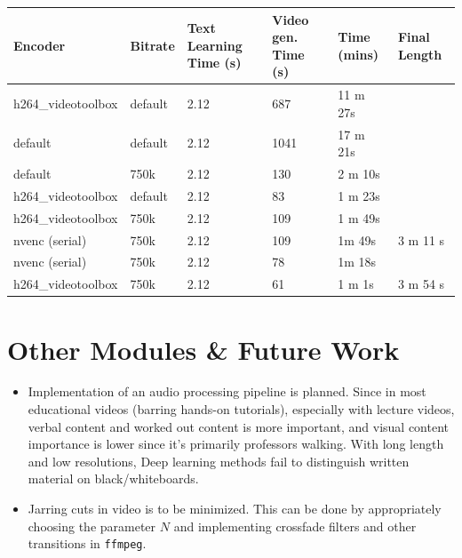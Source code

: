 \documentclass{article}
\begin{document}
\begin{table}[ht]
\begin{tabular}{|l|l|l|l|l|l|}
\hline
Encoder            & Bitrate & Text Learning Time (s) & Video gen. Time (s)                   & Time (mins)                   & Final Length                                       \\ \hline \hline
h264\_videotoolbox & default & 2.12 & 687                        & 11 m 27s                       &                                                    \\ \cline{1-4}
default            & default & 2.12 & 1041                       & 17 m 21s                       &                                                    \\ \cline{1-4}
default            & 750k    & 2.12 & 130                        & 2 m 10s                        &                                                    \\ \cline{1-4}
h264\_videotoolbox & default & 2.12 & 83                         & 1 m 23s                        &                                                    \\ \cline{1-4}
h264\_videotoolbox & 750k    & 2.12 & 109                        & 1 m 49s                        &                                                    \\ \cline{1-4}
nvenc (serial)     & 750k     & 2.12 & 109                        & 1m 49s                         & \multirow{-6}{*}{3 m 11 s}                         \\ \hline
nvenc (serial)     & 750k     & 2.12 & \cellcolor[HTML]{67FD9A}78 & \cellcolor[HTML]{67FD9A}1m 18s & \cellcolor[HTML]{67FD9A}                           \\ \cline{1-4}
h264\_videotoolbox & 750k     & 2.12 & \cellcolor[HTML]{67FD9A}61 & \cellcolor[HTML]{67FD9A}1 m 1s & \multirow{-2}{*}{\cellcolor[HTML]{67FD9A}3 m 54 s} \\ \hline
\end{tabular}
\end{table}
		
			\section{Other Modules \& Future Work}
		\begin{itemize}
			\item Implementation of an audio processing pipeline is planned. Since in most educational videos (barring hands-on tutorials), especially with lecture videos, verbal content and worked out content is more important, and visual content importance is lower since it's primarily professors walking. With long length and low resolutions, Deep learning methods fail to distinguish written material on black/whiteboards.
			\item Jarring cuts in video is to be minimized. This can be done by appropriately choosing the parameter \(N\) and implementing crossfade filters and other transitions in \verb|ffmpeg|.
		\end{itemize}
\end{document}
